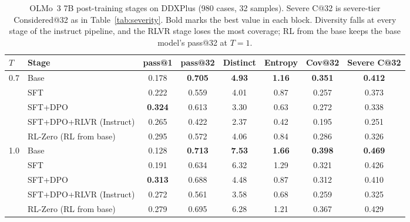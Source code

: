 \documentclass[wcp]{jmlr}
\begin{document}
\begin{table}[t]
\centering\small
\begin{adjustbox}{max width=\linewidth}
\begin{tabular}{llcccccc}
\toprule
$T$ & Stage & pass@1 & pass@32 & Distinct & Entropy & Cov@32 & Severe C@32 \\
\midrule
0.7 & Base & 0.178 & \textbf{0.705} & \textbf{4.93} & \textbf{1.16} & \textbf{0.351} & \textbf{0.412} \\
 & SFT & 0.222 & 0.559 & 4.01 & 0.87 & 0.257 & 0.373 \\
 & SFT+DPO & \textbf{0.324} & 0.613 & 3.30 & 0.63 & 0.272 & 0.338 \\
 & SFT+DPO+RLVR (Instruct) & 0.265 & 0.422 & 2.37 & 0.42 & 0.195 & 0.251 \\
 & RL-Zero (RL from base) & 0.295 & 0.572 & 4.06 & 0.84 & 0.286 & 0.326 \\
\midrule
1.0 & Base & 0.128 & \textbf{0.713} & \textbf{7.53} & \textbf{1.66} & \textbf{0.398} & \textbf{0.469} \\
 & SFT & 0.191 & 0.634 & 6.32 & 1.29 & 0.321 & 0.426 \\
 & SFT+DPO & \textbf{0.313} & 0.688 & 4.48 & 0.87 & 0.312 & 0.410 \\
 & SFT+DPO+RLVR (Instruct) & 0.272 & 0.561 & 3.58 & 0.68 & 0.259 & 0.325 \\
 & RL-Zero (RL from base) & 0.279 & 0.695 & 6.28 & 1.21 & 0.367 & 0.429 \\
\bottomrule
\end{tabular}
\end{adjustbox}
\caption{OLMo~3 7B post-training stages on DDXPlus (980 cases, 32 samples). Severe C@32 is severe-tier Considered@32 as in Table~\ref{tab:severity}. Bold marks the best value in each block. Diversity falls at every stage of the instruct pipeline, and the RLVR stage loses the most coverage; RL from the base keeps the base model's pass@32 at $T{=}1$.}
\label{tab:stages}
\end{table}
\end{document}
